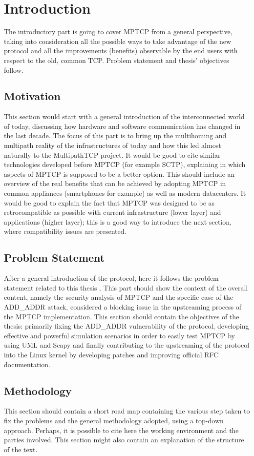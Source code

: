 \chapter{Introduction}
\label{chap:introduction}

The introductory part is going to cover MPTCP from a general perspective, taking into consideration all the possible ways to take advantage of the new protocol and all the improvements (benefits) observable by the end users with respect to the old, common TCP. Problem statement and thesis' objectives follow.

\section{Motivation}
This section would start with a general introduction of the interconnected world of today, discussing how hardware and software communication has changed in the last decade. The focus of this part is to bring up the multihoming and multipath reality of the infrastructures of today and how this led almost naturally to the MultipathTCP project. It would be good to cite similar technologies developed before MPTCP (for example SCTP), explaining in which aspects of MPTCP is supposed to be a better option.
This should include an overview of the real benefits that can be achieved by adopting MPTCP in common appliances (smartphones for example) as well as modern datacenters. It would be good to explain the fact that MPTCP was designed to be as retrocompatible as possible with current infrastructure (lower layer) and applications (higher layer); this is a good way to introduce the next section, where compatibility issues are presented.

\section{Problem Statement}
After a general introduction of the protocol, here it follows the problem statement related to this thesis .
This part should show the context of the overall content, namely the security analysis of MPTCP and the specific case of the ADD\_ADDR attack, considered a blocking issue in the upstreaming process of the MPTCP implementation.
This section should contain the objectives of the thesis: primarily fixing the ADD\_ADDR vulnerability of the protocol, developing effective and powerful simulation scenarios in order to easily test MPTCP by using UML and Scapy and finally contributing to the upstreaming of the protocol into the Linux kernel by developing patches and improving official RFC documentation.

\section{Methodology}
This section should contain a short road map containing the various step taken to fix the problems and the general methodology adopted, using a top-down approach.
Perhaps, it is possible to cite here the working environment and the parties involved. This section might also contain an explanation of the structure of the text.
